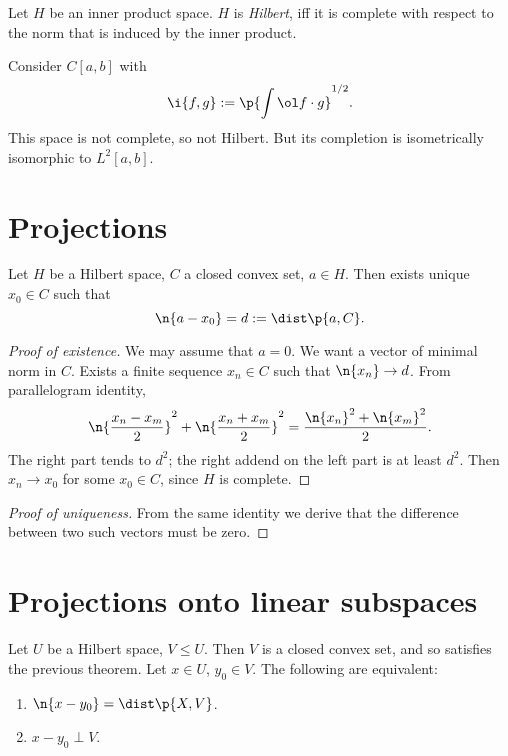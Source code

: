 \begin{definition}
  Let $H$ be an inner product space.
  $H$ is \emph{Hilbert}, iff it is complete with respect to the norm that is induced by the inner product.
\end{definition}

\begin{example}
  Consider $C[a,b]$ with
  $$ \i{f,g} := \p{ \int \ol f \cdot g }^{1/2}. $$
  This space is not complete, so not Hilbert.
  But its completion is isometrically isomorphic to $L^2[a, b]$.
\end{example}

\section{Projections}

\begin{theorem}
  Let $H$ be a Hilbert space, $C$ a closed convex set, $a \in H$.
  Then exists unique $x_0 \in C$ such that
  $$ \n{a-x_0} = d := \dist \p{a, C}. $$
\end{theorem}

\begin{proof}[Proof of existence]
  We may assume that $a = 0$.
  We want a vector of minimal norm in $C$.
  Exists a finite sequence $x_n \in C$ such that $\n{x_n} \to d$.
  From parallelogram identity,
  $$ \n{\frac{x_n-x_m}{2}}^2 + \n{\frac{x_n+x_m}{2}}^2 = \frac{\n{x_n}^2+\n{x_m}^2}{2}. $$
  The right part tends to $d^2$; the right addend on the left part is at least $d^2$. Then $x_n \to x_0$ for some $x_0 \in C$, since $H$ is complete.
\end{proof}

\begin{proof}[Proof of uniqueness]
  From the same identity we derive that the difference between two such vectors must be zero.
\end{proof}

\section{Projections onto linear subspaces}

\begin{theorem}
  Let $U$ be a Hilbert space, $V \le U$.
  Then $V$ is a closed convex set, and so satisfies the previous theorem.
  Let $x \in U$, $y_0 \in V$.
  The following are equivalent:
  \begin{enumerate}
    \item $\n{x-y_0} = \dist\p{X, V}$.
    \item $x-y_0 \perp V$.
  \end{enumerate}  
\end{theorem}


